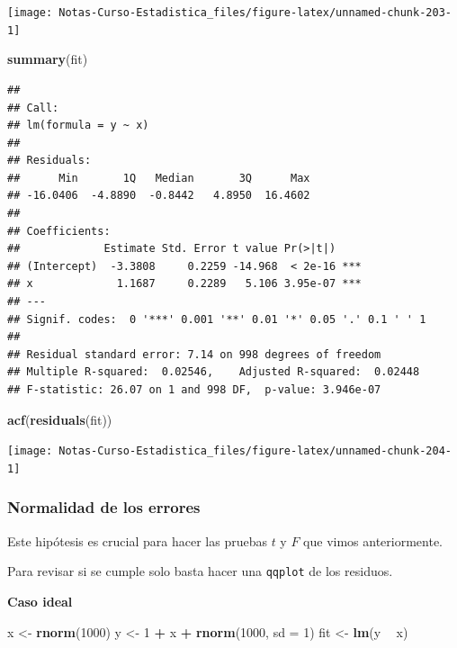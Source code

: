 \documentclass[
  12pt,
]{book}
\newenvironment{Shaded}{\begin{snugshade}}{\end{snugshade}}
\newcommand{\DataTypeTok}[1]{\textcolor[rgb]{0.13,0.29,0.53}{#1}}
\newcommand{\DecValTok}[1]{\textcolor[rgb]{0.00,0.00,0.81}{#1}}
\newcommand{\KeywordTok}[1]{\textcolor[rgb]{0.13,0.29,0.53}{\textbf{#1}}}
\newcommand{\NormalTok}[1]{#1}
\newcommand{\OperatorTok}[1]{\textcolor[rgb]{0.81,0.36,0.00}{\textbf{#1}}}
\newcommand{\StringTok}[1]{\textcolor[rgb]{0.31,0.60,0.02}{#1}}
\theoremstyle{definition}
\theoremstyle{definition}
\theoremstyle{definition}
\theoremstyle{remark}
\begin{document}
\begin{center}\texttt{[image: Notas-Curso-Estadistica\_files/figure-latex/unnamed-chunk-203-1]} \end{center}

\begin{Shaded}
\begin{Highlighting}[]
\KeywordTok{summary}\NormalTok{(fit)}
\end{Highlighting}
\end{Shaded}

\begin{verbatim}
## 
## Call:
## lm(formula = y ~ x)
## 
## Residuals:
##      Min       1Q   Median       3Q      Max 
## -16.0406  -4.8890  -0.8442   4.8950  16.4602 
## 
## Coefficients:
##             Estimate Std. Error t value Pr(>|t|)    
## (Intercept)  -3.3808     0.2259 -14.968  < 2e-16 ***
## x             1.1687     0.2289   5.106 3.95e-07 ***
## ---
## Signif. codes:  0 '***' 0.001 '**' 0.01 '*' 0.05 '.' 0.1 ' ' 1
## 
## Residual standard error: 7.14 on 998 degrees of freedom
## Multiple R-squared:  0.02546,    Adjusted R-squared:  0.02448 
## F-statistic: 26.07 on 1 and 998 DF,  p-value: 3.946e-07
\end{verbatim}

\begin{Shaded}
\begin{Highlighting}[]
\KeywordTok{acf}\NormalTok{(}\KeywordTok{residuals}\NormalTok{(fit))}
\end{Highlighting}
\end{Shaded}

\begin{center}\texttt{[image: Notas-Curso-Estadistica\_files/figure-latex/unnamed-chunk-204-1]} \end{center}

\hypertarget{normalidad-de-los-errores}{%
\subsubsection{Normalidad de los errores}\label{normalidad-de-los-errores}}

Este hipótesis es crucial para hacer las pruebas \(t\) y \(F\) que vimos anteriormente.

Para revisar si se cumple solo basta hacer una \texttt{qqplot} de los residuos.

\textbf{Caso ideal}

\begin{Shaded}
\begin{Highlighting}[]
\NormalTok{x <-}\StringTok{ }\KeywordTok{rnorm}\NormalTok{(}\DecValTok{1000}\NormalTok{)}
\NormalTok{y <-}\StringTok{ }\DecValTok{1} \OperatorTok{+}\StringTok{ }\NormalTok{x }\OperatorTok{+}\StringTok{ }\KeywordTok{rnorm}\NormalTok{(}\DecValTok{1000}\NormalTok{, }\DataTypeTok{sd =} \DecValTok{1}\NormalTok{)}
\NormalTok{fit <-}\StringTok{ }\KeywordTok{lm}\NormalTok{(y }\OperatorTok{~}\StringTok{ }\NormalTok{x)}
\end{Highlighting}
\end{Shaded}
\end{document}
